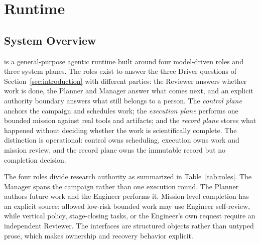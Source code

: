 \section{\systemname Runtime}
\label{sec:method}

\subsection{System Overview}

\systemname is a general-purpose agentic runtime built around four model-driven roles
and three system planes. The roles exist to answer the three Driver questions of
Section~\ref{sec:introduction} with different parties: the Reviewer answers whether
work is done, the Planner and Manager answer what comes next, and an explicit
authority boundary answers what still belongs to a person. The \emph{control plane}
anchors the campaign and schedules work; the \emph{execution plane} performs one
bounded mission against real tools and artifacts; and the \emph{record plane} stores
what happened without deciding whether the work is scientifically complete. The
distinction is operational: control owns scheduling, execution owns work and mission
review, and the record plane owns the immutable record but no completion decision.

The four roles divide research authority as summarized in
Table~\ref{tab:roles}. The Manager spans the campaign rather than one execution
round. The Planner authors future work and the Engineer performs it. Mission-level
completion has an explicit source: allowed low-risk bounded work may use Engineer
self-review, while vertical policy, stage-closing tasks, or the Engineer's own
request require an independent Reviewer. The interfaces are structured objects
rather than untyped prose, which makes ownership and recovery behavior explicit.

